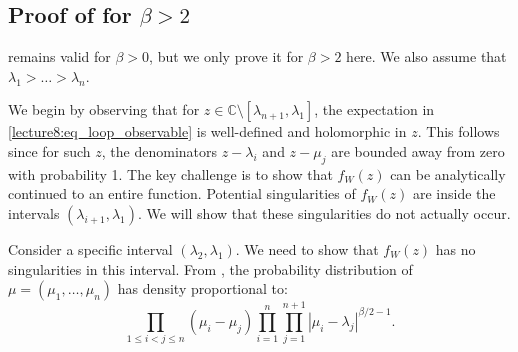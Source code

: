 \documentclass[letterpaper,11pt,oneside,reqno]{book}
\numberwithin{equation}{chapter}  %
\theoremstyle{definition}
\begin{document}
\subsection{Proof of  for $\beta>2$}

 remains
valid for $\beta>0$, but we only prove it for $\beta>2$ here.
We also assume that $\lambda_1>\ldots>\lambda_n $.


We begin by observing that for $z \in \mathbb{C} \setminus [\lambda_{n+1}, \lambda_1]$, the expectation in \eqref{lecture8:eq_loop_observable} is well-defined and holomorphic in $z$. This follows since for such $z$, the denominators $z-\lambda_i$ and $z-\mu_j$ are bounded away from zero with probability 1.
The key challenge is to show that $f_W(z)$ can be analytically continued to an entire function.
Potential singularities of $f_W(z)$ are inside the intervals $(\lambda_{i+1}, \lambda_{1})$. We will show that these singularities do not actually occur.

Consider a specific interval $(\lambda_2, \lambda_{1})$. We need to show that $f_W(z)$ has no singularities in this interval.
From , the probability distribution of $\mu = (\mu_1, \ldots, \mu_n)$ has density proportional to:
\begin{equation*}
	\prod_{1\le i<j\le n} (\mu_i - \mu_j) \prod_{i=1}^{n} \prod_{j=1}^{n+1} |\mu_i - \lambda_j|^{\beta/2-1}.
\end{equation*}
\end{document}
